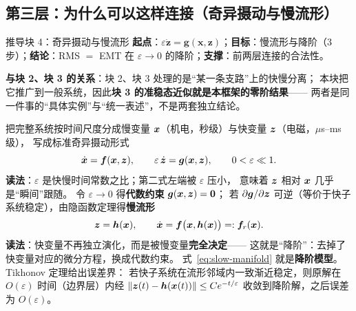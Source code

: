 \subsection{第三层：为什么可以这样连接（奇异摄动与慢流形）}
\begin{derivblock}{推导块 4：奇异摄动与慢流形}
\textbf{起点}：$\varepsilon\dot{\bm z}=\bm g(\bm x,\bm z)$；\textbf{目标}：慢流形与降阶（3 步）；\textbf{结论}：RMS $=$ EMT 在 $\varepsilon\to0$ 的降阶；\textbf{支撑}：前两层连接的合法性。

\textbf{与块 2、块 3 的关系}：块 2、块 3 处理的是“某一条支路”上的快慢分离；
本块把它推广到一般系统，因此\textbf{块 3 的准稳态近似就是本框架的零阶结果}——
两者是同一件事的“具体实例”与“统一表述”，不是两套独立结论。


\label{sec:singular}

把完整系统按时间尺度分成慢变量 $\bm{x}$（机电，秒级）与快变量 $\bm{z}$（电磁，$\mu$s--ms 级），
写成标准奇异摄动形式
\begin{equation}
\dot{\bm{x}}=\bm{f}(\bm{x},\bm{z}),\qquad
\varepsilon\,\dot{\bm{z}}=\bm{g}(\bm{x},\bm{z}),\qquad
0<\varepsilon\ll1 .
\label{eq:singular}
\end{equation}
\textbf{读法}：$\varepsilon$ 是快慢时间常数之比；第二式左端被 $\varepsilon$ 压小，
意味着 $\bm{z}$ 相对 $\bm{x}$ 几乎是“瞬间”跟随。
令 $\varepsilon\to0$ 得\textbf{代数约束} $\bm{g}(\bm{x},\bm{z})=\bm{0}$；
若 $\partial\bm{g}/\partial\bm{z}$ 可逆（等价于快子系统稳定），由隐函数定理得\textbf{慢流形}
\begin{equation}
\bm{z}=\bm{h}(\bm{x}),\qquad
\dot{\bm{x}}=\bm{f}\bigl(\bm{x},\bm{h}(\bm{x})\bigr)=:\bm{f}_r(\bm{x}).
\label{eq:slow-manifold}
\end{equation}
\textbf{读法}：快变量不再独立演化，而是被慢变量\textbf{完全决定}——
这就是“降阶”：去掉了快变量对应的微分方程，换成代数约束。
式~\eqref{eq:slow-manifold} 就是\textbf{降阶模型}。Tikhonov 定理给出误差界：
若快子系统在流形邻域内一致渐近稳定，则原解在 $O(\varepsilon)$ 时间（边界层）内经
$\|\bm{z}(t)-\bm{h}(\bm{x}(t))\|\le C e^{-t/\varepsilon}$ 收敛到降阶解，之后误差为 $O(\varepsilon)$。

\end{derivblock}

